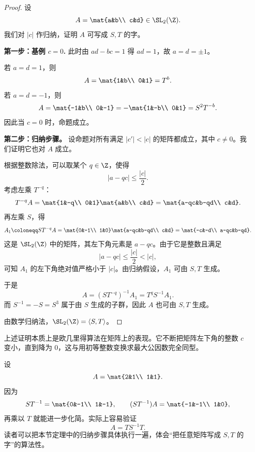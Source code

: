\begin{proof}
设
\[
A=\mat{a&b\\ c&d}\in \SL_2(\Z).
\]
我们对 $|c|$ 作归纳，证明 $A$ 可写成 $S,T$ 的字。

\medskip
\noindent\textbf{第一步：基例 $c=0$.}
此时由 $ad-bc=1$ 得 $ad=1$，故 $a=d=\pm 1$。

若 $a=d=1$，则
\[
A=\mat{1&b\\ 0&1}=T^b.
\]
若 $a=d=-1$，则
\[
A=\mat{-1&b\\ 0&-1}=-\mat{1&-b\\ 0&1}=S^2T^{-b}.
\]
因此当 $c=0$ 时，命题成立。

\medskip
\noindent\textbf{第二步：归纳步骤。}
设命题对所有满足 $|c'|<|c|$ 的矩阵都成立，其中 $c\ne 0$。我们证明它也对 $A$ 成立。

根据整数除法，可以取某个 $q\in\Z$，使得
\[
|a-qc|\le \frac{|c|}{2}.
\]
考虑左乘 $T^{-q}$：
\[
T^{-q}A=
\mat{1&-q\\ 0&1}
\mat{a&b\\ c&d}
=
\mat{a-qc&b-qd\\ c&d}.
\]
再左乘 $S$，得
\[
A_1\coloneqq ST^{-q}A
=
\mat{0&-1\\ 1&0}
\mat{a-qc&b-qd\\ c&d}
=
\mat{-c&-d\\ a-qc&b-qd}.
\]
这是 $\SL_2(\Z)$ 中的矩阵，其左下角元素是 $a-qc$。由于它是整数且满足
\[
|a-qc|\le \frac{|c|}{2}<|c|,
\]
可知 $A_1$ 的左下角绝对值严格小于 $|c|$。由归纳假设，$A_1$ 可由 $S,T$ 生成。

于是
\[
A=(ST^{-q})^{-1}A_1=T^qS^{-1}A_1.
\]
而 $S^{-1}=-S=S^3$ 属于由 $S$ 生成的子群，因此 $A$ 也可由 $S,T$ 生成。

由数学归纳法，$\SL_2(\Z)=\langle S,T\rangle$。
\end{proof}

\begin{remark}
上述证明本质上是欧几里得算法在矩阵上的表现。它不断把矩阵左下角的整数 $c$ 变小，直到降为 $0$，这与用初等整数变换求最大公因数完全同型。
\end{remark}

\begin{example}
设
\[
A=\mat{2&1\\ 1&1}.
\]
因为
\[
ST^{-1}=
\mat{0&-1\\ 1&-1},
\qquad
(ST^{-1})A=
\mat{-1&-1\\ 1&0},
\]
再乘以 $T$ 就能进一步化简。实际上容易验证
\[
A=TS^{-1}T.
\]
读者可以把本节定理中的归纳步骤具体执行一遍，体会“把任意矩阵写成 $S,T$ 的字”的算法性。
\end{example}

